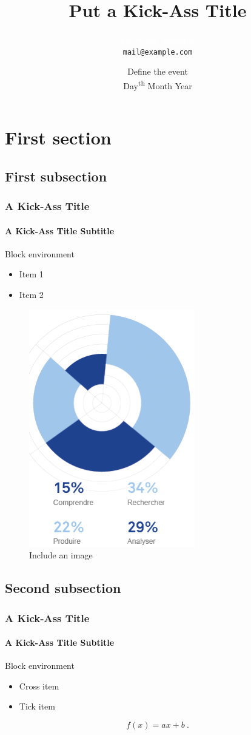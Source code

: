 \documentclass{beamer}
\title{\bf Put a Kick-Ass Title}
\author{\textcolor{white} {Firstname Surname} \\ \texttt{mail@example.com}}
\date{\textcolor{nicewhite} {Define the event} \\ Day\textsuperscript{th} Month Year}
\institute{Universit\'e de Bourgogne Franche-Comt\'e}
\newcommand{\tick}{\color{green!60!black!80}\ding{51}}
\newcommand{\cross}{\color{red!60!black!80}\ding{55}}
\begin{document}
\begin{frame}
  \titlepage
\end{frame}

\begin{frame}
  \tableofcontents[sectionstyle=show,subsectionstyle=show,subsubsectionstyle=hide]
\end{frame}

\section{First section}

\subsection{First subsection}

\begin{frame}
  \frametitle{A Kick-Ass Title}
  \framesubtitle{A Kick-Ass Title Subtitle}
  \begin{block}{Block environment}
    \begin{itemize}
    \item Item 1
    \item Item 2
    \end{itemize}
  \end{block}
  \begin{figure}
    \centering
    \includegraphics[width=.25\textwidth]{./images/logos/FlatDesign.png}
    \caption{Include an image}
  \end{figure}
\end{frame}

\subsection{Second subsection}

\begin{frame}
  \frametitle{A Kick-Ass Title}
  \framesubtitle{A Kick-Ass Title Subtitle}
  \begin{block}{Block environment}
    \begin{itemize}
    \item[\cross] Cross item
    \item[\tick] Tick item
    \end{itemize}
  \end{block}
  \begin{equation}
    \label{eq:eq1}
    f(x)=ax+b \ .
  \end{equation}
\end{frame}
\end{document}
